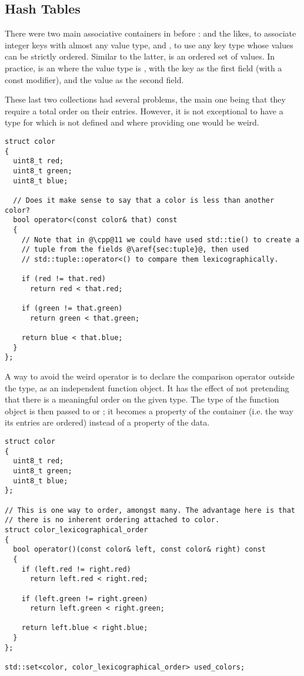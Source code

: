 \subsection{Hash Tables}

\problemtitle

There were two main associative containers in \cpp{} before :
 and the likes, to associate integer keys with
almost any value type, and , to use any key type whose
values can be strictly ordered. Similar to the latter, 
is an ordered set of values. In practice,  is an
 where the value type is , with the key
as the first field (with a const modifier), and the value as the
second field.

These last two collections had several problems, the main one being
that they require a total order on their entries. However, it is not
exceptional to have a type for which  is not defined
and where providing one would be weird.

\begin{lstlisting}
struct color
{
  uint8_t red;
  uint8_t green;
  uint8_t blue;

  // Does it make sense to say that a color is less than another color?
  bool operator<(const color& that) const
  {
    // Note that in @\cpp@11 we could have used std::tie() to create a
    // tuple from the fields @\aref{sec:tuple}@, then used
    // std::tuple::operator<() to compare them lexicographically.

    if (red != that.red)
      return red < that.red;

    if (green != that.green)
      return green < that.green;

    return blue < that.blue;
  }
};
\end{lstlisting}

A way to avoid the weird operator is to declare the comparison
operator outside the type, as an independent function object. It has
the effect of not pretending that there is a meaningful order on the
given type. The type of the function object is then passed to
 or ; it becomes a property of the
container (i.e. the way its entries are ordered) instead of a property
of the data.

\begin{lstlisting}
struct color
{
  uint8_t red;
  uint8_t green;
  uint8_t blue;
};

// This is one way to order, amongst many. The advantage here is that
// there is no inherent ordering attached to color.
struct color_lexicographical_order
{
  bool operator()(const color& left, const color& right) const
  {
    if (left.red != right.red)
      return left.red < right.red;

    if (left.green != right.green)
      return left.green < right.green;

    return left.blue < right.blue;
  }
};

std::set<color, color_lexicographical_order> used_colors;
\end{lstlisting}

